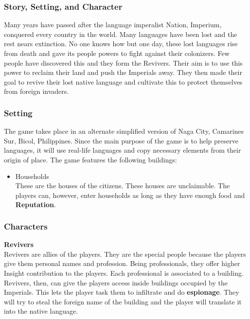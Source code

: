 \documentclass[11pt]{article}
\begin{document}
\subsubsection{Story, Setting, and Character}
Many years have passed after the language imperalist Nation, Imperium, conquered every country in the world. Many languages have been lost and the rest nears extinction. No one knows how but one day, these lost languages rise from death and gave its people powers to fight against their colonizers. Few people have discovered this and they form the Revivers. Their aim is to use this power to reclaim their land and push the Imperials away. They then made their goal to revive their lost native language and cultivate this to protect themselves from foreign invaders. 

\subsubsection{Setting}
The game takes place in an alternate simplified version of Naga City, Camarines Sur, Bicol, Philippines. Since the main purpose of the game is to help preserve languages, it will use real-life languages and copy necessary elements from their origin of place. The game features the following buildings:
\begin{itemize}
\item
  Households\\
  These are the houses of the citizens. These houses are unclaimable. The players can, however, enter households as long as they have enough food and \textbf{Reputation}.
\end{itemize}

\subsubsection{Characters}
\textbf{Revivers}\\
Revivers are allies of the players. They are the special people because the players give them personal names and profession. Being professionals, they offer higher Insight contribution to the players. Each professional is associated to a building. Revivers, then, can give the players access inside buildings occupied by the Imperials. This lets the player task them to infiltrate and do \textbf{espionage}. They will try to steal the foreign name of the building and the player will translate it into the native language.
\end{document}
